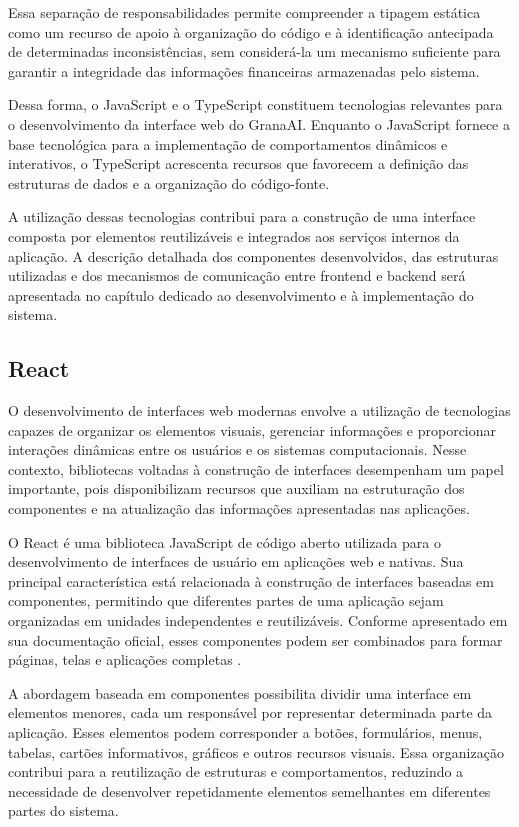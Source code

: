 Essa separação de responsabilidades permite compreender a tipagem estática como um recurso de apoio à organização do código e à identificação antecipada de determinadas inconsistências, sem considerá-la um mecanismo suficiente para garantir a integridade das informações financeiras armazenadas pelo sistema.

Dessa forma, o JavaScript e o TypeScript constituem tecnologias relevantes para o desenvolvimento da interface web do GranaAI. Enquanto o JavaScript fornece a base tecnológica para a implementação de comportamentos dinâmicos e interativos, o TypeScript acrescenta recursos que favorecem a definição das estruturas de dados e a organização do código-fonte.

A utilização dessas tecnologias contribui para a construção de uma interface composta por elementos reutilizáveis e integrados aos serviços internos da aplicação. A descrição detalhada dos componentes desenvolvidos, das estruturas utilizadas e dos mecanismos de comunicação entre frontend e backend será apresentada no capítulo dedicado ao desenvolvimento e à implementação do sistema.


\subsection{React}

O desenvolvimento de interfaces web modernas envolve a utilização de tecnologias capazes de organizar os elementos visuais, gerenciar informações e proporcionar interações dinâmicas entre os usuários e os sistemas computacionais. Nesse contexto, bibliotecas voltadas à construção de interfaces desempenham um papel importante, pois disponibilizam recursos que auxiliam na estruturação dos componentes e na atualização das informações apresentadas nas aplicações.

O React é uma biblioteca JavaScript de código aberto utilizada para o desenvolvimento de interfaces de usuário em aplicações web e nativas. Sua principal característica está relacionada à construção de interfaces baseadas em componentes, permitindo que diferentes partes de uma aplicação sejam organizadas em unidades independentes e reutilizáveis. Conforme apresentado em sua documentação oficial, esses componentes podem ser combinados para formar páginas, telas e aplicações completas \cite{react_docs_2026}.

A abordagem baseada em componentes possibilita dividir uma interface em elementos menores, cada um responsável por representar determinada parte da aplicação. Esses elementos podem corresponder a botões, formulários, menus, tabelas, cartões informativos, gráficos e outros recursos visuais. Essa organização contribui para a reutilização de estruturas e comportamentos, reduzindo a necessidade de desenvolver repetidamente elementos semelhantes em diferentes partes do sistema.

